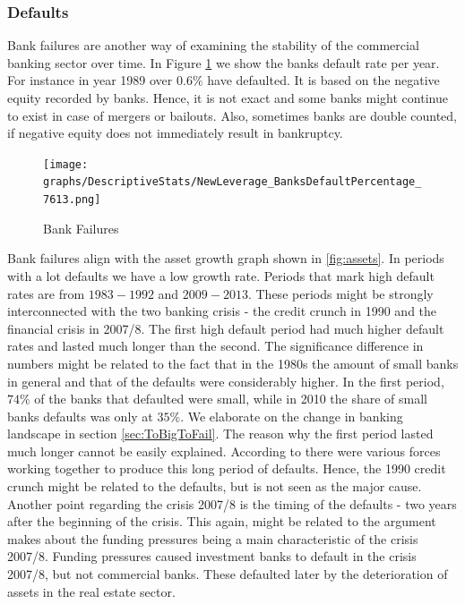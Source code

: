 \documentclass[12pt, a4paper]{article} %
\begin{document}

\subsubsection{Defaults}

Bank failures are another way of examining the stability of the commercial banking sector over time. In Figure \ref{fig:banks_default} we show the banks default rate per year. For instance in year 1989 over $0.6\%$ have defaulted. It is based on the negative equity recorded by banks. Hence, it is not exact and some banks might continue to exist in case of mergers or bailouts. Also, sometimes banks are double counted, if negative equity does not immediately result in bankruptcy.

\begin{figure}[H]
\texttt{[image: graphs/DescriptiveStats/NewLeverage\_BanksDefaultPercentage\_7613.png]}
\centering
\caption{Bank Failures}
\label{fig:banks_default}
\end{figure}


Bank failures align with the asset growth graph shown in \ref{fig:assets}. In periods with a lot defaults we have a low growth rate. Periods that mark high default rates are from $1983-1992$ and $2009-2013$. These periods might be strongly interconnected with the two banking crisis - the credit crunch in 1990 and the financial crisis in 2007/8. The first high default period had much higher default rates and lasted much longer than the second.
The significance difference in numbers might be related to the fact that in the 1980s the amount of small banks in general and that of the defaults were considerably higher.  In the first period, $74\%$ of the banks that defaulted were small, while in 2010 the share of small banks defaults was only at $35\%$. We elaborate on the change in banking landscape in section \ref{sec:ToBigToFail}. The reason why the first period lasted much longer cannot be easily explained. According to \citet{federal1997history} there were various forces working together to produce this long period of defaults. Hence, the 1990 credit crunch might be related to the defaults, but is not seen as the major cause.
Another point regarding the crisis 2007/8 is the timing of the defaults - two years after the beginning of the crisis. This again, might be related to the argument \cite{antoniades2019commercial} makes about the funding pressures being a main characteristic of the crisis 2007/8. Funding pressures caused investment banks to default in the crisis 2007/8, but not commercial banks. These defaulted later by the deterioration of assets in the real estate sector.
\end{document}
